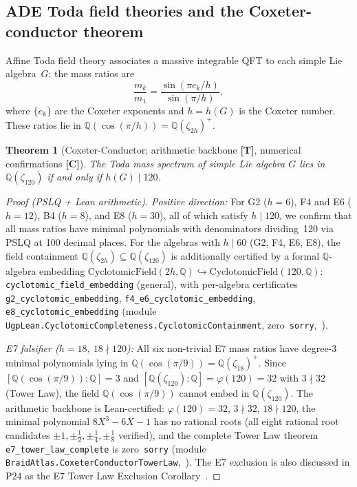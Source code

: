 \documentclass[11pt]{article}
\newtheorem{theorem}{Theorem}[section]
\theoremstyle{remark}
\newcommand{\zetaN}[1]{\zeta_{#1}}
\newcommand{\lean}[1]{\texttt{#1}}
\begin{document}
\subsection{ADE Toda field theories and the Coxeter-conductor theorem}

Affine Toda field theory associates a massive integrable QFT to each simple
Lie algebra~$G$; the mass ratios are
\begin{equation}
  \frac{m_k}{m_1} = \frac{\sin(\pi e_k/h)}{\sin(\pi/h)},
\end{equation}
where $\{e_k\}$ are the Coxeter exponents and $h = h(G)$ is the Coxeter number.
These ratios lie in $\mathbb{Q}(\cos(\pi/h)) = \mathbb{Q}(\zetaN{2h})^+$.

\begin{theorem}[Coxeter-Conductor; arithmetic backbone \textbf{[T]}, numerical confirmations \textbf{[C]}]
\label{thm:coxeter}
The Toda mass spectrum of simple Lie algebra $G$ lies in $\mathbb{Q}(\zetaN{120})$
if and only if $h(G) \mid 120$.
\end{theorem}

\begin{proof}[Proof (PSLQ + Lean arithmetic)]
\emph{Positive direction:}
For G2 ($h=6$), F4 and E6 ($h=12$), B4 ($h=8$), and E8 ($h=30$), all of which
satisfy $h\mid 120$, we confirm that all mass ratios have minimal polynomials with
denominators dividing~120 via PSLQ at 100 decimal places.
For the algebras with $h\mid 60$ (G2, F4, E6, E8), the field containment
$\mathbb{Q}(\zeta_{2h})\subseteq\mathbb{Q}(\zetaN{120})$ is additionally certified
by a formal $\mathbb{Q}$-algebra embedding
$\mathrm{CyclotomicField}(2h,\mathbb{Q})\hookrightarrow\mathrm{CyclotomicField}(120,\mathbb{Q})$:
\texttt{cyclotomic\_field\_embedding} (general), with per-algebra certificates
\texttt{g2\_cyclotomic\_embedding}, \texttt{f4\_e6\_cyclotomic\_embedding},
\texttt{e8\_cyclotomic\_embedding}
(module \texttt{UgpLean.CyclotomicCompleteness.CyclotomicContainment},
zero~\texttt{sorry},~\cite{ugp-lean}).

\emph{E7 falsifier ($h=18$, $18\nmid 120$):}
All six non-trivial E7 mass ratios have degree-3 minimal polynomials lying in
$\mathbb{Q}(\cos(\pi/9)) = \mathbb{Q}(\zetaN{18})^+$.
Since $[\mathbb{Q}(\cos(\pi/9)):\mathbb{Q}] = 3$ and
$[\mathbb{Q}(\zetaN{120}):\mathbb{Q}] = \varphi(120) = 32$ with $3 \nmid 32$
(Tower Law), the field $\mathbb{Q}(\cos(\pi/9))$ cannot embed in
$\mathbb{Q}(\zetaN{120})$.
The arithmetic backbone is Lean-certified:
$\varphi(120)=32$, $3\nmid 32$, $18\nmid 120$,
the minimal polynomial $8X^3-6X-1$ has no rational roots (all eight rational root
candidates $\pm1, \pm\tfrac{1}{2}, \pm\tfrac{1}{4}, \pm\tfrac{1}{8}$ verified),
and the complete Tower Law theorem
\lean{e7\_tower\_law\_complete} is zero~\lean{sorry}
(module \lean{BraidAtlas.CoxeterConductorTowerLaw},~\cite{ugp-lean}).
The E7 exclusion is also discussed in P24 as the E7 Tower Law Exclusion
Corollary~\cite{Spivack2026_Uniqueness25}.
\end{proof}
\end{document}
